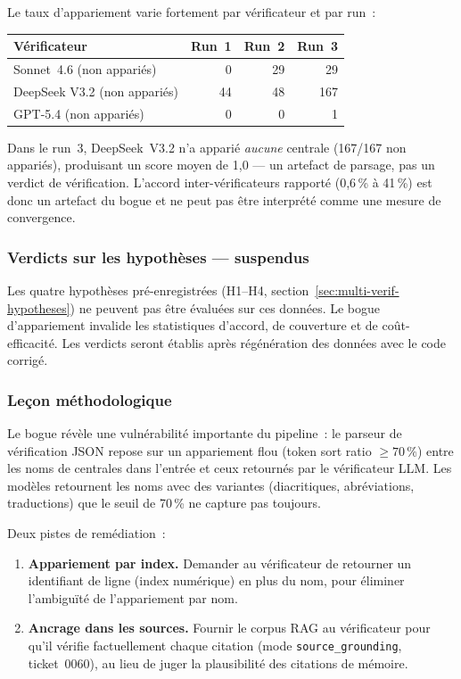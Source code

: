 Le taux d'appariement varie fortement par v\'erificateur et par run~:

\begin{center}
\small
\begin{tabular}{lrrr}
\toprule
\textbf{V\'erificateur} & \textbf{Run~1} & \textbf{Run~2} & \textbf{Run~3} \\
\midrule
Sonnet~4.6 (non appari\'es)    & 0   & 29  & 29  \\
DeepSeek V3.2 (non appari\'es) & 44  & 48  & 167 \\
GPT-5.4 (non appari\'es)       & 0   & 0   & 1   \\
\bottomrule
\end{tabular}
\end{center}

\noindent Dans le run~3, DeepSeek~V3.2 n'a appari\'e \emph{aucune} centrale
(167/167 non appari\'es), produisant un score moyen de 1,0 --- un artefact
de parsage, pas un verdict de v\'erification. L'accord inter-v\'erificateurs
rapport\'e (0,6\,\% \`a 41\,\%) est donc un artefact du bogue et ne peut pas
\^etre interpr\'et\'e comme une mesure de convergence.

\subsubsection{Verdicts sur les hypoth\`eses --- suspendus}

Les quatre hypoth\`eses pr\'e-enregistr\'ees (H1--H4,
section~\ref{sec:multi-verif-hypotheses}) ne peuvent pas \^etre \'evalu\'ees
sur ces donn\'ees. Le bogue d'appariement invalide les statistiques
d'accord, de couverture et de co\^ut-efficacit\'e. Les verdicts seront
\'etablis apr\`es r\'eg\'en\'eration des donn\'ees avec le code corrig\'e.

\subsubsection{Le\c{c}on m\'ethodologique}

Le bogue r\'ev\`ele une vuln\'erabilit\'e importante du pipeline~: le parseur
de v\'erification JSON repose sur un appariement flou (token sort ratio
$\geq 70\,\%$) entre les noms de centrales dans l'entr\'ee et ceux retourn\'es
par le v\'erificateur LLM. Les mod\`eles retournent les noms avec des
variantes (diacritiques, abr\'eviations, traductions) que le seuil de
70\,\% ne capture pas toujours.

Deux pistes de rem\'ediation~:
\begin{enumerate}
\item \textbf{Appariement par index.} Demander au v\'erificateur de
  retourner un identifiant de ligne (index num\'erique) en plus du nom,
  pour \'eliminer l'ambigu\"it\'e de l'appariement par nom.
\item \textbf{Ancrage dans les sources.} Fournir le corpus RAG au
  v\'erificateur pour qu'il v\'erifie factuellement chaque citation (mode
  \texttt{source\_grounding}, ticket~0060), au lieu de juger la plausibilit\'e
  des citations de m\'emoire.
\end{enumerate}

